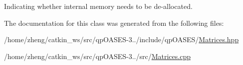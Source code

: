 Indicating whether internal memory needs to be de-\/allocated. 

The documentation for this class was generated from the following files\+:\begin{DoxyCompactItemize}
\item 
/home/zheng/catkin\+\_\+ws/src/qp\+O\+A\+S\+E\+S-\/3../include/qp\+O\+A\+S\+E\+S/\hyperlink{_matrices_8hpp}{Matrices.\+hpp}\item 
/home/zheng/catkin\+\_\+ws/src/qp\+O\+A\+S\+E\+S-\/3../src/\hyperlink{_matrices_8cpp}{Matrices.\+cpp}\end{DoxyCompactItemize}
